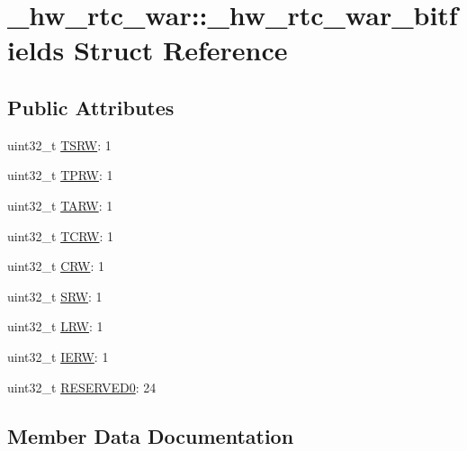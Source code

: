 \hypertarget{struct__hw__rtc__war_1_1__hw__rtc__war__bitfields}{}\section{\+\_\+hw\+\_\+rtc\+\_\+war\+:\+:\+\_\+hw\+\_\+rtc\+\_\+war\+\_\+bitfields Struct Reference}
\label{struct__hw__rtc__war_1_1__hw__rtc__war__bitfields}
\subsection*{Public Attributes}
\begin{DoxyCompactItemize}
\item 
uint32\+\_\+t \hyperlink{struct__hw__rtc__war_1_1__hw__rtc__war__bitfields_a0293740840b805ba1879082516b53322}{T\+S\+RW}\+: 1
\item 
uint32\+\_\+t \hyperlink{struct__hw__rtc__war_1_1__hw__rtc__war__bitfields_aa52206fd19983ddfd5424b6903eee25b}{T\+P\+RW}\+: 1
\item 
uint32\+\_\+t \hyperlink{struct__hw__rtc__war_1_1__hw__rtc__war__bitfields_a0e79262bebca3ac2264e190cd517e914}{T\+A\+RW}\+: 1
\item 
uint32\+\_\+t \hyperlink{struct__hw__rtc__war_1_1__hw__rtc__war__bitfields_a990f4597273cf515d0b4f8ab45fdf883}{T\+C\+RW}\+: 1
\item 
uint32\+\_\+t \hyperlink{struct__hw__rtc__war_1_1__hw__rtc__war__bitfields_a55aba6feb706f6996f8cc9702670b563}{C\+RW}\+: 1
\item 
uint32\+\_\+t \hyperlink{struct__hw__rtc__war_1_1__hw__rtc__war__bitfields_a7cf5646fdacbaebb477f39d41e2b239a}{S\+RW}\+: 1
\item 
uint32\+\_\+t \hyperlink{struct__hw__rtc__war_1_1__hw__rtc__war__bitfields_a15d4ad2bd80b6e6727101499c1938187}{L\+RW}\+: 1
\item 
uint32\+\_\+t \hyperlink{struct__hw__rtc__war_1_1__hw__rtc__war__bitfields_a600bc3fb72bfc104290571d4acab354c}{I\+E\+RW}\+: 1
\item 
uint32\+\_\+t \hyperlink{struct__hw__rtc__war_1_1__hw__rtc__war__bitfields_a40daaf781956438d1af2d936202bc223}{R\+E\+S\+E\+R\+V\+E\+D0}\+: 24
\end{DoxyCompactItemize}


\subsection{Member Data Documentation}
